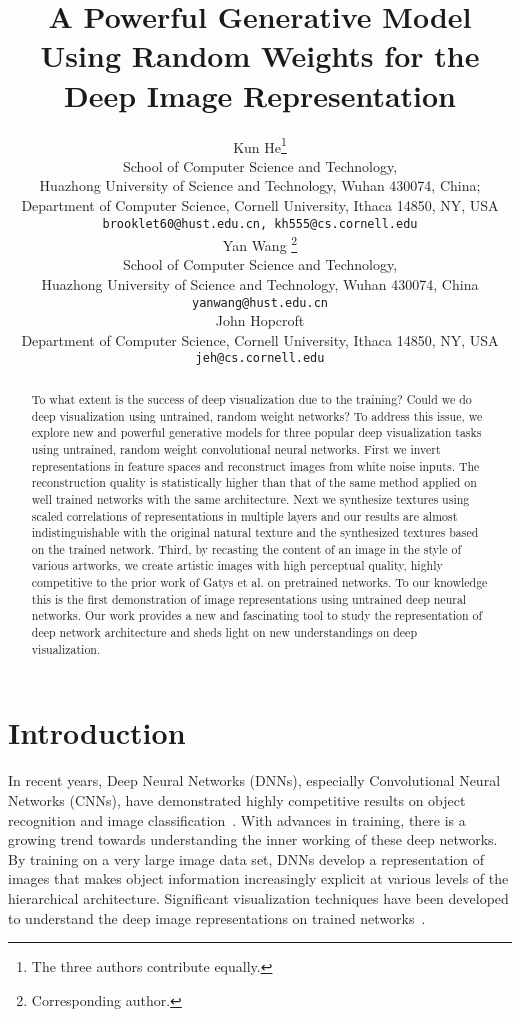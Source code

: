 \documentclass{article}
\title{A Powerful Generative Model Using Random Weights for the Deep Image Representation}
\author{
  Kun He\thanks{
  The three authors contribute equally. } \\
  School of Computer Science and Technology, \\
  Huazhong University of Science and Technology,
  Wuhan 430074, China;\\
  Department of Computer Science, Cornell University, Ithaca 14850, NY, USA  \\
  \texttt{brooklet60@hust.edu.cn, kh555@cs.cornell.edu} \\
  \AND
  Yan Wang \thanks{Corresponding author.}\\
 School of Computer Science and Technology, \\
 Huazhong University of Science and Technology,
 Wuhan 430074, China \\
 \texttt{yanwang@hust.edu.cn} \\
 \AND
  John Hopcroft \\
  Department of Computer Science,
  Cornell University, Ithaca 14850, NY, USA \\
  \texttt{jeh@cs.cornell.edu} \\
}
\begin{document}
\maketitle

\begin{abstract}
To what extent is the success of deep visualization due to the training? Could we do deep visualization using untrained, random weight networks? To address this issue, we explore new and powerful generative models for three popular deep visualization tasks using untrained, random weight convolutional neural networks. First we invert representations in feature spaces and reconstruct images from white noise inputs. The reconstruction quality is statistically higher than that of the same method applied on well trained networks with the same architecture. Next we synthesize textures using scaled correlations of representations in multiple layers and our results are almost indistinguishable with the original natural texture and the synthesized textures based on the trained network. Third, by recasting the content of an image in the style of various artworks, we create artistic images with high perceptual quality, highly competitive to the prior work of Gatys et al. on pretrained networks. To our knowledge this is the first demonstration of image representations using untrained deep neural networks. Our work provides a new and fascinating tool to study the representation of deep network architecture and sheds light on new understandings on deep visualization.
\end{abstract}


\section{Introduction}
\label{sec:introduction}

In recent years, Deep Neural Networks (DNNs), especially Convolutional Neural Networks (CNNs), have demonstrated highly competitive results on object recognition and image classification~\cite{ILSVRC,Alex2012NIPS,Simonyan14VGG,He2015Residual}.
With advances in training,  there is a growing trend towards %
understanding the inner working of these deep networks.
By training on a very large image data set, DNNs develop a representation of images that makes object information increasingly explicit at various levels of the hierarchical architecture.
Significant visualization techniques have been developed to understand the deep image representations on trained networks~\cite{Erhan2009, Simonyan13Visualise,Mahendran2015CVPR, Gatys2015texture, yosinski2015ICML,Dosovitskiy2015inverting,nguyen2015deepFool}.
\end{document}
